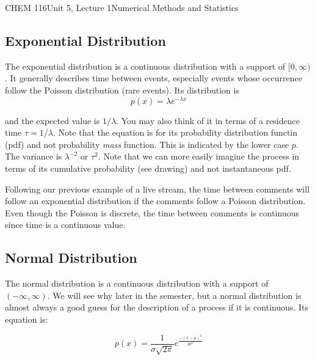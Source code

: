 \documentclass{article}
\begin{document}
\begin{tdoc}{CHEM 116}{Unit 5, Lecture 1}{Numerical Methods and Statistics}
\subsection{Exponential Distribution}
The exponential distribution is a continuous distribution with a
support of $[0,\infty)$. It generally describes time between events,
  especially events whose occurrence follow the Poisson distribution
  (rare events). Its distribution is
\begin{equation}
p(x) = \lambda e^{-\lambda x}
\end{equation}

and the expected value is $ 1 / \lambda$. You may also think of it in
terms of a residence time $\tau = 1 / \lambda$. Note that the equation is for its probability distribution functin (pdf) and not probability \textit{mass} function. This is indicated by the lower case $p$. The variance is
$\lambda^{-2}$ or $\tau^2$. Note that we can more easily imagine the process in
terms of its cumulative probability (see drawing) and not
instantaneous pdf.

Following our previous example of a live stream, the time between
comments will follow an exponential distribution if the comments
follow a Poisson distribution. Even though the Poisson is discrete,
the time between comments is continuous since time is a continuous
value.


\subsection{Normal Distribution}

The normal distribution is a continuous distribution with a support
of $(-\infty, \infty)$. We will see why later in the semester, but a
normal distribution is almost always a good guess for the
description of a process if it is continuous. Its equation is:

\begin{equation}
  p(x) = \frac{1}{\sigma\sqrt{2\pi}}e^{\frac{-(x - \mu)^2}{2\sigma ^2}}
\end{equation}

\end{tdoc}
\end{document}
